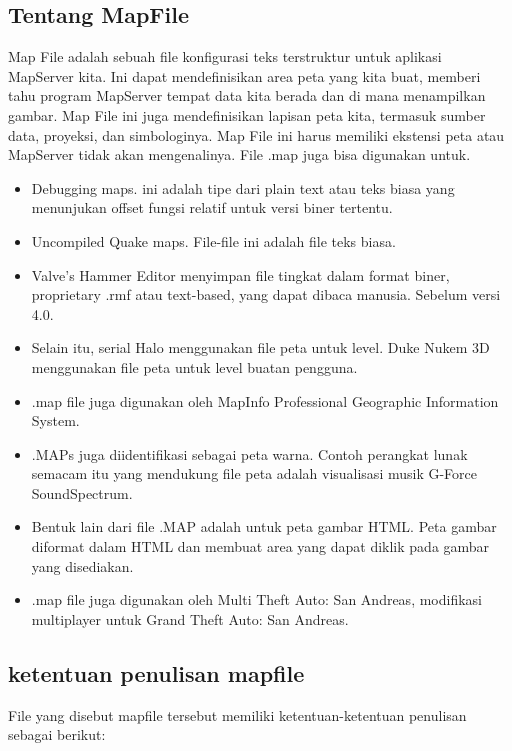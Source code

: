 \subsection{Tentang MapFile}
Map File adalah sebuah file konfigurasi teks terstruktur untuk aplikasi MapServer kita. Ini dapat mendefinisikan area peta yang kita buat, 
memberi tahu program MapServer tempat data kita berada dan di mana menampilkan gambar. 
Map File ini juga mendefinisikan lapisan peta kita, termasuk sumber data, proyeksi, dan simbologinya. 
Map File ini harus memiliki ekstensi peta atau MapServer tidak akan mengenalinya.
File .map juga bisa digunakan untuk.
\begin{itemize}
	\item Debugging maps. ini adalah tipe dari plain text atau teks biasa yang menunjukan offset fungsi relatif untuk versi biner tertentu.
	\item Uncompiled Quake maps. File-file ini adalah file teks biasa.
	\item Valve's Hammer Editor menyimpan file tingkat dalam format biner, proprietary .rmf atau text-based, yang dapat dibaca manusia. Sebelum versi 4.0.
	\item Selain itu, serial Halo menggunakan file peta untuk level. Duke Nukem 3D menggunakan file peta untuk level buatan pengguna.
	\item .map file juga digunakan oleh MapInfo Professional Geographic Information System.
	\item .MAPs juga diidentifikasi sebagai peta warna. Contoh perangkat lunak semacam itu yang mendukung file peta adalah visualisasi musik G-Force SoundSpectrum.
	\item Bentuk lain dari file .MAP adalah untuk peta gambar HTML. Peta gambar diformat dalam HTML dan membuat area yang dapat diklik pada gambar yang disediakan.
	\item .map file juga digunakan oleh Multi Theft Auto: San Andreas, modifikasi multiplayer untuk Grand Theft Auto: San Andreas.
\end{itemize}


\subsection{ketentuan penulisan mapfile}
File yang disebut mapfile tersebut memiliki ketentuan-ketentuan penulisan sebagai berikut:

